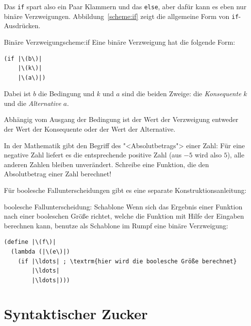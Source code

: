 %
Das \lstinline{if} spart also ein Paar Klammern und das \lstinline{else},
aber dafür kann es eben nur binäre Verzweigungen.
Abbildung~\ref{scheme:if} zeigt die allgemeine Form von
\lstinline{if}-Ausdrücken.
\begin{feature}{Binäre Verzweigung}{scheme:if}
  Eine binäre Verzweigung hat die folgende Form:
\begin{lstlisting}
(if |\(b\)|
    |\(k\)|
    |\(a\)|)
\end{lstlisting}
Dabei ist $b$ die Bedingung und $k$ und $a$ sind die
beiden Zweige: die \textit{Konsequente} $k$ und die
\textit{Alternative} $a$.

Abhängig vom Ausgang der
Bedingung ist der Wert der Verzweigung entweder der Wert der Konsequente
oder der Wert der Alternative.
\end{feature}
%
\begin{aufgabeinline}
  In der Mathematik gibt den Begriff des "<Absolutbetrags"> einer
  Zahl: Für eine negative Zahl liefert es die entsprechende positive
  Zahl (aus $-5$ wird also $5$), alle anderen Zahlen bleiben
  unverändert.  Schreibe eine Funktion, die den Absolutbetrag einer
  Zahl berechnet!
\end{aufgabeinline}
%
Für boolesche Fallunterscheidungen gibt es eine separate
Konstruktionsanleitung:
%
\begin{konstruktionsanleitung}{boolesche Fallunterscheidung: Schablone}
  \label{ka:boolesche-fallunterscheidung}
  Wenn sich das Ergebnis einer Funktion nach einer booleschen Größe
  richtet, welche die Funktion mit Hilfe der Eingaben berechnen kann,
  benutze als Schablone im Rumpf eine binäre Verzweigung:
\begin{lstlisting}
(define |\(f\)|
  (lambda (|\(e\)|)
    (if |\ldots| ; \textrm{hier wird die boolesche Größe berechnet}
        |\ldots|
        |\ldots|)))
\end{lstlisting}
\end{konstruktionsanleitung}

\section{Syntaktischer Zucker}

